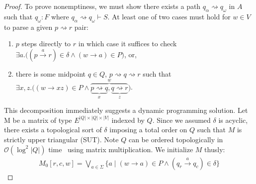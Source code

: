 \documentclass[sigplan,acmsmall,nonacm,screen]{acmart}\settopmatter{printfolios=false,printccs=false,printacmref=false}
\begin{document}
\begin{proof}[Proof]
  To prove nonemptiness, we must show there exists a path $q_\alpha \rightsquigarrow q_\omega$ in $A$ such that $q_\omega: F$ where $q_\alpha \rightsquigarrow q_\omega \vdash S$. At least one of two cases must hold for $w \in V$ to parse a given $p \rightsquigarrow r$ pair:

  \begin{enumerate}
    \item $p$ steps directly to $r$ in which case it suffices to check $\exists a.\big((p \overset{a}{\rightarrow} r)\in \delta \land (w \rightarrow a) \in P\big)$, or,
    \item there is some midpoint $q \in Q$, $p \rightsquigarrow q \rightsquigarrow r$ such that $\exists x, z.\big((w \rightarrow xz) \in P\land\overbrace{\underbrace{p \rightsquigarrow q}_x, \underbrace{q \rightsquigarrow r}_z}^w\big)$.
  \end{enumerate}

  \noindent This decomposition immediately suggests a dynamic programming solution. Let M be a matrix of type $E^{|Q|\times|Q|\times|V|}$ indexed by $Q$. Since we assumed $\delta$ is acyclic, there exists a topological sort of $\delta$ imposing a total order on $Q$ such that $M$ is strictly upper triangular (SUT). Note $Q$ can be ordered topologically in $\mathcal{O}(\log^2 |Q|)$ time~\cite{dekel1981parallel} using matrix multiplication. We initialize $M$ thusly:
  \begin{align}
    M_0[r, c, w] = \bigvee_{a\in\Sigma} \big\{a \mid (w \rightarrow a) \in P \land (q_r \overset{a}{\rightarrow} q_c)\in \delta\big\}
  \end{align}


\end{proof}
\end{document}

